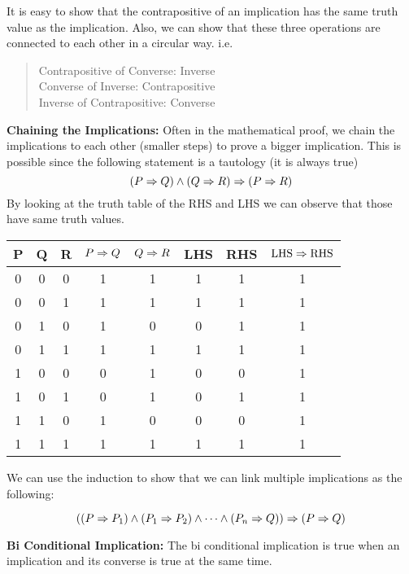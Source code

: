 It is easy to show that the contrapositive of an implication has the same truth value as the implication. Also, we can show that these three operations are connected to each other in a circular way. i.e.
\begin{quote}
	Contrapositive of Converse: Inverse \\
	Converse of Inverse: Contrapositive \\
	Inverse of Contrapositive: Converse
\end{quote}


\textbf{Chaining the Implications:} Often in the mathematical proof, we chain the implications to each other (smaller steps) to prove a bigger implication. This is possible since the following statement is a tautology (it is always true)
\[  (P \Rightarrow Q) \wedge (Q \Rightarrow R) \Rightarrow (P \Rightarrow R)  \]
By looking at the truth table of the RHS and LHS we can observe that those have same truth values.
\begin{center}
	\begin{tabular}{|c|c|c|c|c|c|c|c|}
		\hline
		P & Q & R & $ P \Rightarrow Q $ & $ Q \Rightarrow R $ & LHS & RHS & $ \text{LHS} \Rightarrow \text{RHS} $ \\
		\hline
		0 & 0 & 0 & 1 & 1 & 1 & 1 & 1 \\
		\hline
		0 & 0 & 1 & 1 & 1 & 1 & 1 & 1 \\
		\hline
		0 & 1 & 0 & 1 & 0 & 0 & 1 & 1 \\
		\hline
		0 & 1 & 1 & 1 & 1 & 1 & 1 & 1 \\
		\hline
		1 & 0 & 0 & 0 & 1 & 0 & 0 & 1 \\
		\hline
		1 & 0 & 1 & 0 & 1 & 0 & 1 & 1 \\
		\hline
		1 & 1 & 0 & 1 & 0 & 0 & 0 & 1 \\
		\hline
		1 & 1 & 1 & 1 & 1 & 1 & 1 & 1 \\
		\hline
	\end{tabular}
\end{center} 
We can use the induction to show that we can link multiple implications as the following:

\begin{equation}\label{equ:babyImplicationImplyBigImplicationProof}
	((P \Rightarrow P_1) \wedge (P_1 \Rightarrow P_2) \wedge \cdots \wedge (P_n \Rightarrow Q)) \Rightarrow (P \Rightarrow Q)
\end{equation}

\newpage
\textbf{Bi Conditional Implication:} The bi conditional implication is true when an implication and its converse is true at the same time.

